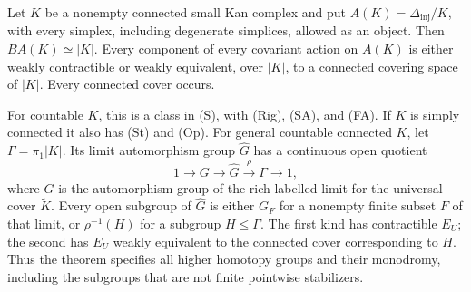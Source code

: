 \begin{theorem}
\label{B:kan-recovery}
Let $K$ be a nonempty connected small Kan complex and put
$A(K)=\Delta_{\mathrm{inj}}/K$, with every simplex, including
degenerate simplices, allowed as an object. Then
$BA(K)\simeq |K|$. Every component of every covariant action
on $A(K)$ is either weakly contractible or weakly equivalent,
over $|K|$, to a connected covering space of $|K|$.
Every connected cover occurs.

For countable $K$, this is a class in (S), with (Rig), (SA),
and (FA). If $K$ is simply connected it also has (St) and
(Op). For general countable connected $K$, let
$\Gamma=\pi_1|K|$. Its limit automorphism group $\widehat G$
has a continuous open quotient
\[
 1\longrightarrow G\longrightarrow\widehat G
       \xrightarrow{\rho}\Gamma\longrightarrow1,
\]
where $G$ is the automorphism group of the rich labelled
limit for the universal cover $\widetilde K$.
Every open subgroup of $\widehat G$ is either $G_F$ for a
nonempty finite subset $F$ of that limit, or
$\rho^{-1}(H)$ for a subgroup $H\leq\Gamma$.
The first kind has contractible $E_U$; the second has $E_U$
weakly equivalent to the connected cover corresponding to $H$.
Thus the theorem specifies all higher homotopy groups and their
monodromy, including the subgroups that are not finite
pointwise stabilizers.
\end{theorem}
